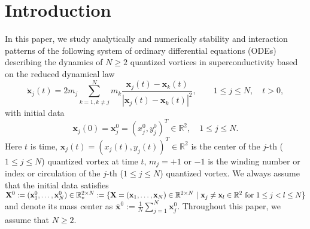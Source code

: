 \documentclass{aims}
\theoremstyle{plain}
\theoremstyle{definition}
\newcommand{\bx}{{\mathbf x}}
\newcommand{\bX}{{\mathbf X}}
\newcommand{\be} {\begin{equation}}
\newcommand{\ee}{\end{equation}}
\begin{document}
\section{Introduction}
\setcounter{equation}{0}
\setcounter{figure}{0}
In this paper, we study analytically and numerically stability and interaction patterns of the following system of
ordinary differential equations (ODEs) describing the dynamics
of $N\ge2$ quantized vortices in superconductivity
based on the reduced dynamical law \cite{Neu2,Jerrard,Lin96,Zhang1,Zhang2}
\be\label{GLE}
\dot{\mathbf{x}}_j(t)=2m_j\displaystyle\sum_{k=1,k\neq
j}^{N}m_k\frac{\mathbf{x}_j(t)-\mathbf{x}_k(t)}{\left|
\mathbf{x}_j(t)-\mathbf{x}_k(t)\right|^2},\qquad 1\le j\le N, \quad t> 0,
\ee
with initial data
\be\label{GLEi}
\mathbf{x}_j(0)=\mathbf x_j^0=(x_j^0,y_j^0)^T\in {\mathbb R}^2,\quad
1\le j\le N.
\ee
Here $t$ is time, $\mathbf x_j(t)=(x_j(t), y_j(t))^T\in \mathbb R^2$
is the center of the $j$-th ($1\le j\le N$) quantized vortex at time $t$,
$m_j=+1$ or $-1$ is the winding number or index or circulation of
the $j$-th ($1\le j\le N$) quantized vortex. We always assume that the initial data satisfies $\bX^0:=(\bx_1^0,\ldots,\bx_N^0)\in
{\mathbb R}_*^{2\times N}:=
\{\bX=(\bx_1,\ldots,\bx_N)\in {\mathbb R}^{2\times N}\ |\
\bx_j\ne \bx_l\in {\mathbb R}^2\ \hbox{for}\ 1\le j<l\le N\}$
and denote its mass center as $\bar\bx^0:=\frac{1}{N}\sum_{j=1}^N\bx_j^0$.
Throughout this paper, we assume that $N\ge2$.
\end{document}
